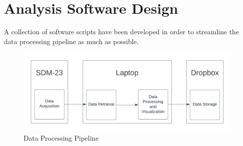 \section{Analysis Software Design}
A collection of software scripts have been developed in order to streamline the data processing pipeline as much as possible.
\begin{figure}[H]
    \centering
    \includegraphics[width=5in]{images/SDM23DataPipeline.png}
    \caption{Data Processing Pipeline}
    \label{fig:dpp}
\end{figure}

